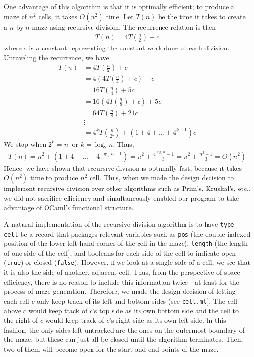 \documentclass[11pt, margin=1in]{article}
\newcommand{\tab}{\par \qquad}
\begin{document}
\tab One advantage of this algorithm is that it is optimally efficient; to produce a maze of $n^2$ cells, it takes $O(n^2)$ time.  Let $T(n)$ be the time it takes to create a $n$ by $n$ maze using recursive division.  The recurrence relation is then
\begin{align*}
T(n) = 4T\left(\frac{n}{2}\right) + c
\end{align*}  
where $c$ is a constant representing the constant work done at each division.  Unraveling the recurrence, we have
\begin{align*}
T(n) &= 4T\left(\frac{n}{2}\right) + c \\
&= 4\left(4T\left(\frac{n}{4}\right) + c\right) + c \\ 
&= 16 T\left(\frac{n}{4}\right) + 5c \\
&= 16 \left(4T\left(\frac{n}{8}\right) + c\right) + 5c \\ 
&= 64 T\left(\frac{n}{8}\right) + 21c \\
& \vdots \\
& = 4^k T\left(\frac{n}{2^k}\right) + (1 + 4 + \ldots + 4^{k-1})c
\end{align*}
We stop when $2^k = n$, or $k = \log_2n$.  Thus, 
\begin{align*}
T(n) = n^2 + (1 + 4 + \ldots + 4^{\log_2n-1}) = n^2 + \frac{4^{\log_2n} - 1}{3} = n^2 + \frac{n^2 - 1}{3} = O(n^2)
\end{align*}
Hence, we have shown that recursive division is optimally fast, because it takes $O(n^2)$ time to produce $n^2$ cell.  Thus, when we made the design decision to implement recursive division over other algorithms such as Prim's, Kruskal's, etc., we did not sacrifice efficiency and simultaneously enabled our program to take advantage of OCaml's functional structure. 
\tab A natural implementation of the recursive division algorithm is to have \texttt{type cell} be a record that packages relevant variables such as \texttt{pos} (the double indexed position of the lower-left hand corner of the cell in the maze), \texttt{length} (the length of one side of the cell), and booleans for each side of the cell to indicate open (\texttt{true}) or closed (\texttt{false}).  However, if we look at a single side of a cell, we see that it is also the side of another, adjacent cell.  Thus, from the perspective of space efficiency, there is no reason to include this information twice - at least for the process of maze generation.  Therefore, we made the design decision of letting each cell $c$ only keep track of its left and bottom sides (see \texttt{cell.ml}).  The cell above $c$ would keep track of $c$'s top side as its own bottom side and the cell to the right of $c$ would keep track of $c$'s right side as its own left side.  In this fashion, the only sides left untracked are the ones on the outermost boundary of the maze, but these can just all be closed until the algorithm terminates.  Then, two of them will become open for the start and end points of the maze. 
\end{document}
